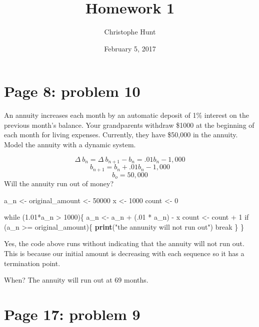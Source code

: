 \documentclass[]{article}
\title{Homework 1}
\author{Christophe Hunt}
\date{February 5, 2017}
\newenvironment{Shaded}{\begin{snugshade}}{\end{snugshade}}
\newcommand{\KeywordTok}[1]{\textcolor[rgb]{0.13,0.29,0.53}{\textbf{{#1}}}}
\newcommand{\DecValTok}[1]{\textcolor[rgb]{0.00,0.00,0.81}{{#1}}}
\newcommand{\FloatTok}[1]{\textcolor[rgb]{0.00,0.00,0.81}{{#1}}}
\newcommand{\StringTok}[1]{\textcolor[rgb]{0.31,0.60,0.02}{{#1}}}
\newcommand{\NormalTok}[1]{{#1}}
\begin{document}
\maketitle

{
\setcounter{tocdepth}{2}
\tableofcontents
}
\section{Page 8: problem 10}\label{page-8-problem-10}

An annuity increases each month by an automatic deposit of 1\% interest
on the previous month's balance. Your grandparents withdraw \$1000 at
the beginning of each month for living expenses. Currently, they have
\$50,000 in the annuity. Model the annuity with a dynamic system.

\[\Delta~b_n=\Delta~b_{n+1}-b_n= .01b_n - 1,000\]
\[b_{n+1}=b_n+ .01b_n - 1,000\] \[b_o = 50,000\] Will the annuity run
out of money?

\begin{Shaded}
\begin{Highlighting}[]
\NormalTok{a_n   <-}\StringTok{ }\NormalTok{original_amount <-}\StringTok{ }\DecValTok{50000}
\NormalTok{x     <-}\StringTok{ }\DecValTok{1000}
\NormalTok{count <-}\StringTok{ }\DecValTok{0}

\NormalTok{while (}\FloatTok{1.01}\NormalTok{*a_n >}\StringTok{ }\DecValTok{1000}\NormalTok{)\{}
\NormalTok{a_n <-}\StringTok{ }\NormalTok{a_n +}\StringTok{ }\NormalTok{(.}\DecValTok{01} \NormalTok{*}\StringTok{ }\NormalTok{a_n) -}\StringTok{ }\NormalTok{x}
\NormalTok{count <-}\StringTok{ }\NormalTok{count +}\StringTok{ }\DecValTok{1}
\NormalTok{if (a_n >=}\StringTok{ }\NormalTok{original_amount)\{}
  \KeywordTok{print}\NormalTok{(}\StringTok{"the annunity will not run out"}\NormalTok{)}
  \NormalTok{break}
 \NormalTok{\}}
\NormalTok{\}}
\end{Highlighting}
\end{Shaded}

Yes, the code above runs without indicating that the annuity will not
run out. This is because our initial amount is decreasing with each
sequence so it has a termination point.

When? The annuity will run out at 69 months.

\newpage

\section{Page 17: problem 9}\label{page-17-problem-9}
\end{document}
